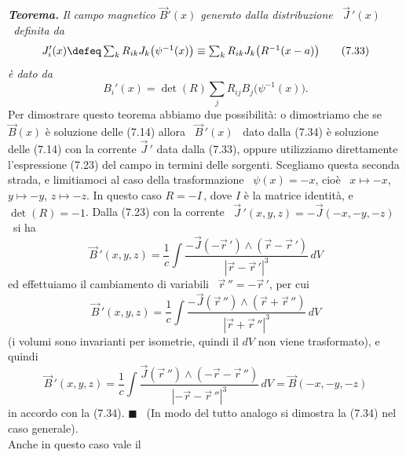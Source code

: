 \textbf{\textit{Teorema.}} \textit{Il campo magnetico $\vec B'(x)$ generato
dalla distribuzione \ $\vec J\,'(x)$ \ definita da}
\begin{equation}
  J_i'(x)\defeq\textstyle\sum_kR_{ik}J_k\big(\psi^{-1}(x)\big)
  \equiv\sum_kR_{ik}J_k\big(R^{-1}(x-a)\big)
  \tag{7.33}
\end{equation}
\textit{\`e dato da}
\begin{equation}
  B_i'(x)=\det(R)\textstyle\sum_jR_{ij}B_j\big(\psi^{-1}(x)\big).
  \tag{7.34}
\end{equation}
Per dimostrare questo teorema abbiamo due possibilit\`a: o dimostriamo che se
$\vec B(x)$ \`e soluzione delle (7.14) allora \ $\vec B\,'(x)$ \ dato dalla
(7.34) \`e soluzione delle (7.14) con la corrente $\vec J\,'$ data dalla (7.33),
oppure utilizziamo direttamente l'espressione (7.23) del campo in termini delle
sorgenti. Scegliamo questa seconda strada, e limitiamoci al caso della
trasformazione \ $\psi(x)=-x$, cio\`e \ $x\mapsto-x$, $y\mapsto-y$,
$z\mapsto-z$. In questo caso $R=-I$\,, dove $I$ \`e la matrice identit\`a, e
$\det(R)=-1$. Dalla (7.23) con la corrente
\ $\vec J\,'(x,y,z)=-\vec J(-x,-y,-z)$ \ si ha
\begin{equation}
  \vec B\,'(x,y,z)=\frac{1}{c}\int
  \frac{-\vec J(-\vec r\,')\wedge(\vec r-\vec r\,')}{|\vec r-\vec r\,'|^3}\,dV
  \tag{7.35}
\end{equation}
ed effettuiamo il cambiamento di variabili \ $\vec r\,''=-\vec r\,'$, per cui
\begin{equation}
  \vec B\,'(x,y,z)=\frac{1}{c}\int
  \frac{-\vec J(\vec r\,'')\wedge(\vec r+\vec r\,'')}{|\vec r+\vec r\,''|^3}\,dV
  \tag{7.36}
\end{equation}
(i volumi sono invarianti per isometrie, quindi il $dV$ non viene trasformato),
e quindi
\begin{equation}
  \vec B\,'(x,y,z)=\frac{1}{c}\int
  \frac{\vec J(\vec r\,'')\wedge(-\vec r-\vec r\,'')}
    {|-\vec r-\vec r\,''|^3}\,dV=\vec B(-x,-y,-z)
  \tag{7.37}
\end{equation}
in accordo con la (7.34). $\blacksquare$ \ (In modo del tutto analogo si
dimostra la (7.34) nel caso generale).\\
Anche in questo caso vale il

